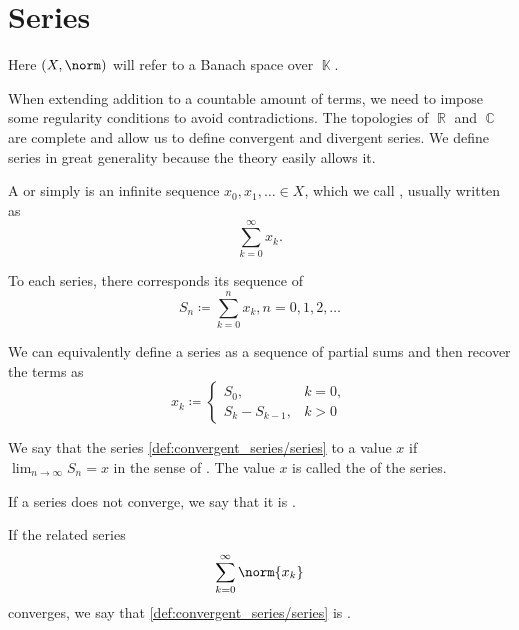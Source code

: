 \section{Series}\label{sec:series}

Here \( (X, \norm) \) will refer to a Banach space over \( \BbbK \).

\begin{definition}\label{def:convergent_series}
  When extending addition to a countable amount of terms, we need to impose some regularity conditions to avoid contradictions. The topologies of \( \BbbR \) and \( \BbbC \) are complete and allow us to define convergent and divergent series. We define series in great generality because the theory easily allows it.

  A  or simply  is an infinite sequence \( x_0, x_1, \ldots \in X \), which we call , usually written as
  \begin{equation}\label{def:convergent_series/series}
    \sum_{k=0}^\infty x_k.
  \end{equation}

  To each series, there corresponds its sequence of 
  \begin{equation*}
    S_n \coloneqq \sum_{k=0}^n x_k, n = 0, 1, 2, \ldots
  \end{equation*}

  We can equivalently define a series as a sequence of partial sums and then recover the terms as
  \begin{equation*}
    x_k \coloneqq \begin{cases}
      S_0,           & k = 0, \\
      S_k - S_{k-1}, & k > 0
    \end{cases}
  \end{equation*}

  We say that the series \eqref{def:convergent_series/series}  to a value \( x \) if \( \lim_{n \to \infty} S_n = x \) in the sense of . The value \( x \) is called the  of the series.

  If a series does not converge, we say that it is .

  If the related series
  \begin{equation}\label{def:convergent_series/absolute_series}
    \sum_{k=0}^\infty \norm{x_k}
  \end{equation}
  converges, we say that \eqref{def:convergent_series/series} is .
\end{definition}

